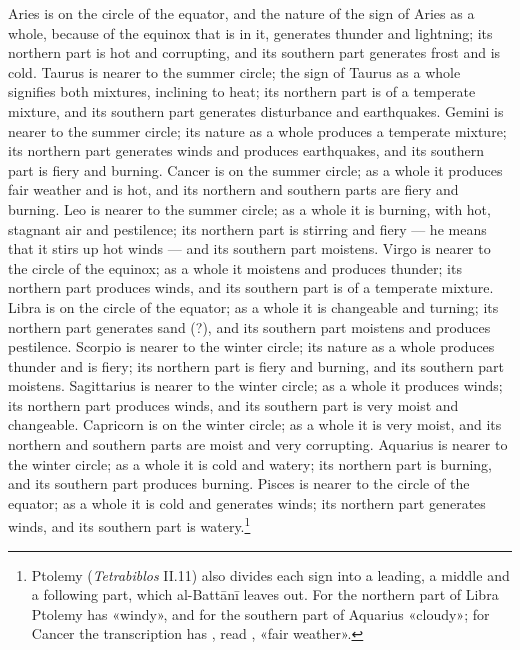 \documentclass[11pt]{article}
\newcommand{\Fol}[1]{\marginpar{\footnotesize\color{gray}f.\,#1}}
\begin{document}
\par \Fol{32r}Aries is on the circle of the equator, and the nature of the sign of Aries as a whole, because of the equinox that is in it, generates thunder and lightning; its northern part is hot and corrupting, and its southern part generates frost and is cold. Taurus is nearer to the summer circle; the sign of Taurus as a whole signifies both mixtures, inclining to heat; its northern part is of a temperate mixture, and its southern part generates disturbance and earthquakes. Gemini is nearer to the summer circle; its nature as a whole produces a temperate mixture; its northern part generates winds and produces earthquakes, and its southern part is fiery and burning. Cancer is on the summer circle; as a whole it produces fair weather and is hot, and its northern and southern parts are fiery and burning. Leo is nearer to the summer circle; as a whole it is burning, with hot, stagnant air and pestilence; its northern part is stirring and fiery — he means that it stirs up hot winds — and its southern part moistens. Virgo is nearer to the circle of the equinox; as a whole it moistens and produces thunder; its northern part produces winds, and its southern part is of a temperate mixture. Libra is on the circle of the equator; as a whole it is changeable and turning; its northern part generates sand (?), and its southern part moistens and produces pestilence. Scorpio is nearer to the winter circle; its nature as a whole produces thunder and is fiery; its northern part is fiery and burning, and its southern part moistens. Sagittarius is nearer to the winter circle; as a whole it produces winds; its northern part produces winds, and its southern part is very moist and changeable. Capricorn is on the winter circle; as a whole it is very moist, and its northern and southern parts are moist and very corrupting. Aquarius is nearer to the winter circle; as a whole it is cold and watery; its northern part is burning, and its southern part produces burning. Pisces is nearer to the circle of the equator; as a whole it is cold and generates winds; its northern part generates winds, and its southern part is watery.\footnote{Ptolemy (\emph{Tetrabiblos} II.11) also divides each sign into a leading, a middle and a following part, which al-Battānī leaves out. For the northern part of Libra Ptolemy has «windy», and for the southern part of Aquarius «cloudy»; for Cancer the transcription has , read , «fair weather».}\par
\end{document}

